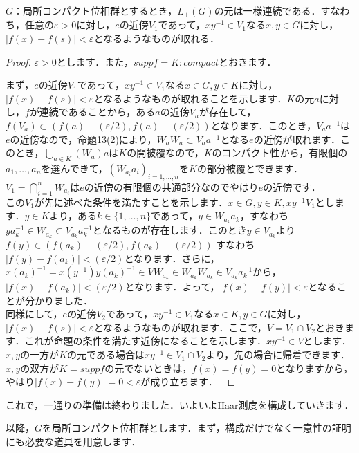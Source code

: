 \begin{prop}
$G$：局所コンパクト位相群とするとき，$L_{+}(G)$の元は一様連続である．すなわち，任意の$\varepsilon>0$に対し，$e$の近傍$V_1$であって，$xy^{-1} \in V_1$なる$x,y \in G$に対し，$|f(x)-f(s)|<\varepsilon$となるようなものが取れる．
\end{prop}
\begin{proof}
$\varepsilon>0$とします．また，$supp f=K \colon compact$とおきます．

まず，$e$の近傍$V_1$であって，$xy^{-1} \in V_1$なる$x \in G, y \in K$に対し，$|f(x)-f(s)|<\varepsilon$となるようなものが取れることを示します．$K$の元$a$に対し，$f$が連続であることから，ある$a$の近傍$V_a$が存在して，$f(V_a) \subset (f(a)-(\varepsilon /2), f(a)+(\varepsilon /2) )$となります．このとき，$V_{a}a^{-1}$は$e$の近傍なので，命題13(2)により，$W_{a}W_{a} \subset V_{a}a^{-1}$となる$e$の近傍が取れます．このとき，$\bigcup_{a \in K}(W_a)a$は$K$の開被覆なので，$K$のコンパクト性から，有限個の$a_1, \ldots, a_n$を選んできて，$( W_{a_i}a_{i} )_{i=1,\ldots,n}$を$K$の部分被覆とできます．$V_1=\bigcap_{i=1}^{n}W_{a_i}$は$e$の近傍の有限個の共通部分なのでやはり$e$の近傍です．\\

この$V_1$が先に述べた条件を満たすことを示します．$x \in G, y \in K, xy^{-1} V_1$とします．$y \in K$より，ある$k \in \{1, \ldots , n \}$であって，$y \in W_{a_k}a_{k}$，すなわち$ya_{k}^{-1} \in W_{a_k} \subset V_{a_k}a_{k}^{-1}$となるものが存在します．このとき$y \in V_{a_k}$より$f(y) \in (f(a_k)-(\varepsilon/2), f(a_k)+(\varepsilon /2) )$ すなわち $|f(y)-f(a_k)|<(\varepsilon /2)$となります．さらに，$x(a_k)^{-1}=x(y^{-1})y(a_k)^{-1} \in VW_{a_k} \in W_{a_k}W_{a_k} \in V_{a_k}a_{k}^{-1}$から，$|f(x)-f(a_k)|<(\varepsilon /2)$となります．よって，$|f(x)-f(y)|<\varepsilon$となることが分かりました．\\

同様にして，$e$の近傍$V_2$であって，$xy^{-1} \in V_1$なる$x \in K, y \in G$に対し，$|f(x)-f(s)|<\varepsilon$となるようなものが取れます．ここで，$V=V_1 \cap V_2$とおきます．これが命題の条件を満たす近傍になることを示します．$xy^{-1} \in V$とします．$x,y$の一方が$K$の元である場合は$xy^{-1} \in V_1 \cap V_2$より，先の場合に帰着できます．$x,y$の双方が$K=supp f$の元でないときは，$f(x)=f(y)=0$となりますから，やはり$|f(x)-f(y)|=0<\varepsilon$が成り立ちます．　
\end{proof}

これで，一通りの準備は終わりました．いよいよHaar測度を構成していきます．

以降，$G$を局所コンパクト位相群とします．まず，構成だけでなく一意性の証明にも必要な道具を用意します．

